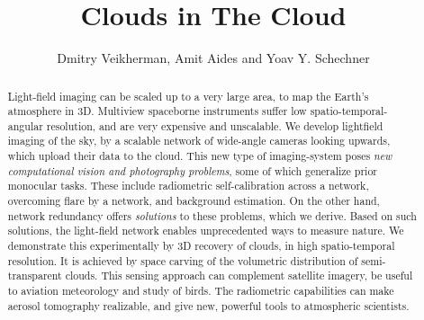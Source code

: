 \documentclass[runningheads]{llncs}
\begin{document}
\newcommand{\point}{
    \raise0.7ex\hbox{.}
    }


\pagestyle{headings}

\mainmatter



\title{Clouds in The Cloud} %



\author{Dmitry Veikherman, Amit Aides and Yoav Y. Schechner} %
\maketitle

\begin{abstract}
Light-field imaging can be scaled up to a very large area, to map the Earth's atmosphere in 3D. Multiview spaceborne instruments suffer low spatio-temporal-angular resolution, and are very expensive and unscalable. We develop lightfield imaging of the sky, by a scalable network of wide-angle cameras  looking upwards, which upload their data to the cloud. This new type of imaging-system poses {\em new computational vision and photography problems}, some of which generalize prior monocular tasks. These include radiometric self-calibration across a network, overcoming flare by a network, and background estimation. On the other hand, network redundancy offers {\em solutions} to these problems, which we derive. Based on such solutions, the light-field network enables unprecedented ways to measure nature. We demonstrate this experimentally by 3D recovery of clouds, in high spatio-temporal resolution. It is achieved by space carving of the volumetric distribution of semi-transparent clouds. This sensing approach can complement satellite imagery, be useful to aviation meteorology and study of birds. The radiometric capabilities can make aerosol tomography realizable, and give new, powerful tools to atmospheric scientists.

\end{abstract}
\end{document}
